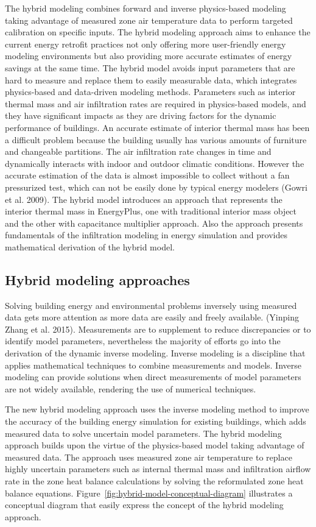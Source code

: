 The hybrid modeling combines forward and inverse physics-based modeling taking advantage of measured zone air temperature data to perform targeted calibration on specific inputs. The hybrid modeling approach aims to enhance the current energy retrofit practices not only offering more user-friendly energy modeling environments but also providing more accurate estimates of energy savings at the same time. The hybrid model avoids input parameters that are hard to measure and replace them to easily measurable data, which integrates physics-based and data-driven modeling methods. Parameters such as interior thermal mass and air infiltration rates are required in physics-based models, and they have significant impacts as they are driving factors for the dynamic performance of buildings. An accurate estimate of interior thermal mass has been a difficult problem because the building usually has various amounts of furniture and changeable partitions. The air infiltration rate changes in time and dynamically interacts with indoor and outdoor climatic conditions. However the accurate estimation of the data is almost impossible to collect without a fan pressurized test, which can not be easily done by typical energy modelers (Gowri et al. 2009). The hybrid model introduces an approach that represents the interior thermal mass in EnergyPlus, one with traditional interior mass object and the other with capacitance multiplier approach. Also the approach presents fundamentals of the infiltration modeling in energy simulation and provides mathematical derivation of the hybrid model. 

\subsection{Hybrid modeling approaches}\label{hybrid-modeling-approaches}

Solving building energy and environmental problems inversely using measured data gets more attention as more data are easily and freely available. (Yinping Zhang et al. 2015). Measurements are to supplement to reduce discrepancies or to identify model parameters, nevertheless the majority of efforts go into the derivation of the dynamic inverse modeling. Inverse modeling is a discipline that applies mathematical techniques to combine measurements and models. Inverse modeling can provide solutions when direct measurements of model parameters are not widely available, rendering the use of numerical techniques.

The new hybrid modeling approach uses the inverse modeling method to improve the accuracy of the building energy simulation for existing buildings, which adds measured data to solve uncertain model parameters. The hybrid modeling approach builds upon the virtue of the physics-based model taking advantage of measured data. The approach uses measured zone air temperature to replace highly uncertain parameters such as internal thermal mass and infiltration airflow rate in the zone heat balance calculations by solving the reformulated zone heat balance equations. Figure~\ref{fig:hybrid-model-conceptual-diagram} illustrates a conceptual diagram that easily express the concept of the hybrid modeling approach. 



